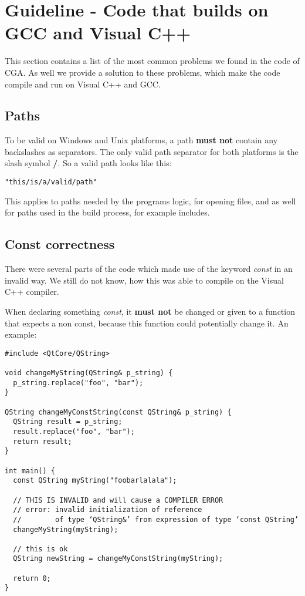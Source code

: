 
\section{Guideline - Code that builds on GCC and Visual C++} This section contains a list of the most common problems we found in the code of CGA. As well we provide a solution to these problems, which make the code compile and run on Visual C++ and GCC.

\subsection{Paths} To be valid on Windows and Unix platforms, a path \textbf{must not} contain any backslashes as separators. The only valid path separator for both platforms is the slash symbol \textbf{/}. So a valid path looks like this: 

\begin{verbatim}
"this/is/a/valid/path" 
\end{verbatim}

This applies to paths needed by the programs logic, for opening files, and as well for paths used in the build process, for example includes.

\subsection{Const correctness} There were several parts of the code which made use of the keyword \emph{const} in an invalid way. We still do not know, how this was able to compile on the Visual C++ compiler.

When declaring something \emph{const}, it \textbf{must not} be changed or given to a function that expects a non const, because this function could potentially change it. An example:
\begin{verbatim}
#include <QtCore/QString>

void changeMyString(QString& p_string) {
  p_string.replace("foo", "bar");
}

QString changeMyConstString(const QString& p_string) {
  QString result = p_string;
  result.replace("foo", "bar");
  return result;
}

int main() {
  const QString myString("foobarlalala");

  // THIS IS INVALID and will cause a COMPILER ERROR
  // error: invalid initialization of reference 
  //        of type ‘QString&’ from expression of type ‘const QString’
  changeMyString(myString);

  // this is ok
  QString newString = changeMyConstString(myString);

  return 0;
}
\end{verbatim}


